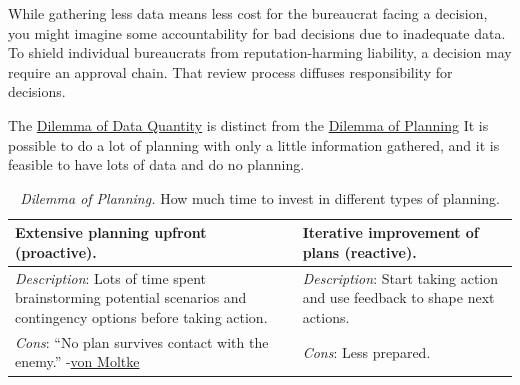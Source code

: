 While gathering less data means less cost for the bureaucrat facing a decision, you might imagine some accountability for bad decisions due to inadequate data. To shield individual bureaucrats from reputation-harming liability, a decision may require an approval chain. That review process diffuses responsibility for decisions.


The \hyperref[table:dilemma-personal-gather-data-lots-vs-little]{Dilemma of Data Quantity} 
 is distinct from the \hyperref[table:dilemma-personal-planning-vs-iterate]{Dilemma of Planning}\iftoggle{printedonpaper}{ (\ref{table:dilemma-personal-planning-vs-iterate}).}{.} 
 It 
is possible to do a lot of planning with only a little information gathered, and it is feasible to have lots of data and do no planning. 

\begin{center}
\begin{table}[H] %
\begin{tabular}{ | m{\dilemmatablewidth}| m{\dilemmatablewidth} | } 
  \hline
  \textbf{Extensive planning upfront (proactive).} & 
  \textbf{Iterative improvement of plans (reactive).} \\ 
  \hline
  \textit{Description}: Lots of time spent brainstorming potential scenarios and contingency options before taking action. & 
  \textit{Description}: Start taking action and use feedback to shape next actions. \\ 
  \hline
  \textit{Cons}: ``No plan survives contact with the enemy.'' {\small -\href{https://en.wikipedia.org/wiki/Helmuth_von_Moltke_the_Elder}{von Moltke}
  \index{Wikipedia!Moltke@\href{https://en.wikipedia.org/wiki/Helmuth_von_Moltke_the_Elder}{Moltke, Helmuth von}}
  } & 
  \textit{Cons}: Less prepared. \\  
  \hline
\end{tabular}
\caption{
\textit{Dilemma of Planning.}
How much time to invest in different types of planning.
}
\label{table:dilemma-personal-planning-vs-iterate}
\end{table}
\end{center}

